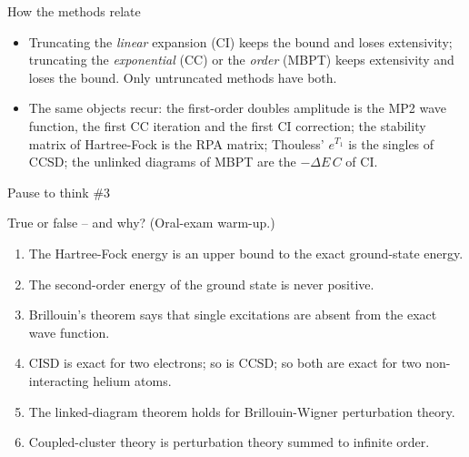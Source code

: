 \documentclass[aspectratio=169,10pt]{beamer}
\newcounter{thinkctr}
\newcommand{\thinkq}[2]{%
  \stepcounter{thinkctr}%
  \vfill
  \begin{tcolorbox}[enhanced,colback=palewarm,colframe=warm,boxrule=1.2pt,arc=4pt,
    grow to left by=6mm,grow to right by=6mm,
    left=16pt,right=16pt,top=16pt,bottom=18pt,
    fonttitle=\bfseries\Large,fontupper=\Large,
    title={Pause to think \#\thethinkctr\hfill\mdseries\normalsize(about #1 min -- discuss with your neighbour)}]
  #2
  \end{tcolorbox}
  \vfill}
\begin{document}
\begin{frame}[shrink=10]{How the methods relate}
\small
\begin{center}
\renewcommand{\arraystretch}{1.25}
\end{center}
\begin{itemize}
\item Truncating the \emph{linear} expansion (CI) keeps the bound and loses extensivity; truncating the \emph{exponential} (CC) or the \emph{order} (MBPT) keeps extensivity and loses the bound. Only untruncated methods have both.
\item The same objects recur: the first-order doubles amplitude is the MP2 wave function, the first CC iteration and the first CI correction; the stability matrix of Hartree-Fock is the RPA matrix; Thouless' $e^{T_1}$ is the singles of CCSD; the unlinked diagrams of MBPT are the $-\Delta E\,C$ of CI.
\end{itemize}
\end{frame}

\begin{frame}{Pause to think \#3}
\thinkq{5}{\normalsize True or false -- and why? (Oral-exam warm-up.)
\begin{enumerate}
\item The Hartree-Fock energy is an upper bound to the exact ground-state energy.
\item The second-order energy of the ground state is never positive.
\item Brillouin's theorem says that single excitations are absent from the exact wave function.
\item CISD is exact for two electrons; so is CCSD; so both are exact for two non-interacting helium atoms.
\item The linked-diagram theorem holds for Brillouin-Wigner perturbation theory.
\item Coupled-cluster theory is perturbation theory summed to infinite order.
\end{enumerate}}
\end{frame}
\end{document}
